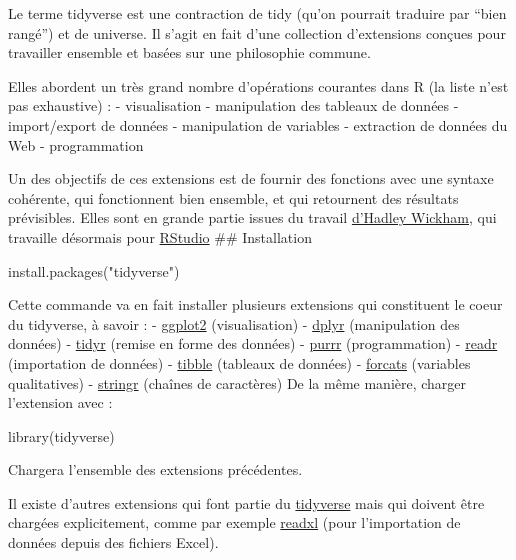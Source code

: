 \documentclass[
]{book}
\newenvironment{Shaded}{\begin{snugshade}}{\end{snugshade}}
\newcommand{\FunctionTok}[1]{\textcolor[rgb]{0.00,0.00,0.00}{#1}}
\newcommand{\NormalTok}[1]{#1}
\newcommand{\StringTok}[1]{\textcolor[rgb]{0.31,0.60,0.02}{#1}}
\begin{document}
Le terme tidyverse est une contraction de tidy (qu'on pourrait traduire par ``bien rangé'') et de universe. Il s'agit en fait d'une collection d'extensions conçues pour travailler ensemble et basées sur une philosophie commune.

Elles abordent un très grand nombre d'opérations courantes dans R (la liste n'est pas exhaustive) :
- visualisation
- manipulation des tableaux de données
- import/export de données
- manipulation de variables
- extraction de données du Web
- programmation

Un des objectifs de ces extensions est de fournir des fonctions avec une syntaxe cohérente, qui fonctionnent bien ensemble, et qui retournent des résultats prévisibles. Elles sont en grande partie issues du travail \href{http://hadley.nz/}{d'Hadley Wickham}, qui travaille désormais pour \href{https://www.rstudio.com/}{RStudio}
\#\# Installation

\begin{Shaded}
\begin{Highlighting}[]
\FunctionTok{install.packages}\NormalTok{(}\StringTok{"tidyverse"}\NormalTok{)}
\end{Highlighting}
\end{Shaded}

Cette commande va en fait installer plusieurs extensions qui constituent le coeur du tidyverse, à savoir :
- \href{http://rdrr.io/pkg/ggplot2}{ggplot2} (visualisation)
- \href{http://rdrr.io/pkg/dplyr}{dplyr} (manipulation des données)
- \href{http://rdrr.io/pkg/tidyr}{tidyr} (remise en forme des données)
- \href{http://rdrr.io/pkg/purrr}{purrr} (programmation)
- \href{http://rdrr.io/pkg/readr}{readr} (importation de données)
- \href{http://rdrr.io/pkg/tibble}{tibble} (tableaux de données)
- \href{http://rdrr.io/pkg/forcats}{forcats} (variables qualitatives)
- \href{http://rdrr.io/pkg/stringr}{stringr} (chaînes de caractères)
De la même manière, charger l'extension avec :

\begin{Shaded}
\begin{Highlighting}[]
\FunctionTok{library}\NormalTok{(tidyverse)}
\end{Highlighting}
\end{Shaded}

Chargera l'ensemble des extensions précédentes.

Il existe d'autres extensions qui font partie du \href{http://rdrr.io/pkg/tidyverse}{tidyverse} mais qui doivent être chargées explicitement, comme par exemple \href{http://rdrr.io/pkg/readxl}{readxl} (pour l'importation de données depuis des fichiers Excel).
\end{document}

